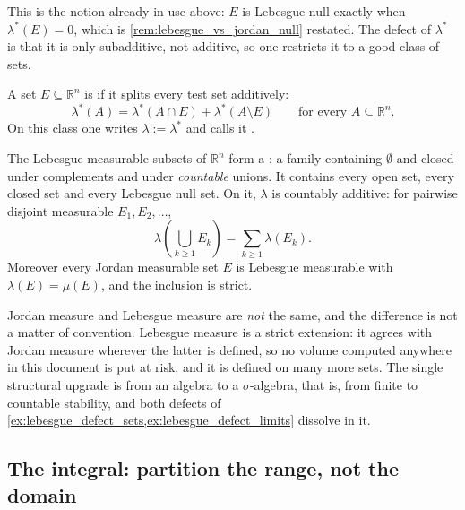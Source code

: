 This is the notion already in use above: $E$ is Lebesgue null exactly when $\lambda^*(E) = 0$, which
is \cref{rem:lebesgue_vs_jordan_null} restated. The defect of $\lambda^*$ is that it is only
subadditive, not additive, so one restricts it to a good class of sets.

\begin{definition}
\label{def:lebesgue_measurable}
A set $E \subseteq \mathbb{R}^n$ is 
 if it splits every test set additively:
\[\lambda^*(A) = \lambda^*(A\cap E) + \lambda^*(A\setminus E) \qquad
\text{for every } A \subseteq \mathbb{R}^n.\]
On this class one writes $\lambda := \lambda^*$ and calls it 
.
\end{definition}

\begin{theorem}
\label{thm:lebesgue_measure_properties}
The Lebesgue measurable subsets of $\mathbb{R}^n$ form a 
: a family containing $\emptyset$ and closed under complements and
under \emph{countable} unions. It contains every open set, every closed set and every Lebesgue null
set. On it, $\lambda$ is countably additive: for pairwise disjoint measurable $E_1,E_2,\dots$,
\[\lambda\left(\bigcup_{k\ge1}E_k\right) = \sum_{k\ge1}\lambda(E_k).\]
Moreover every Jordan measurable set $E$ is Lebesgue measurable with $\lambda(E) = \mu(E)$, and the
inclusion is strict.
\end{theorem}

\begin{remark}
\label{rem:jordan_is_not_lebesgue}
Jordan measure and Lebesgue measure are \emph{not} the same, and the difference is not a matter of
convention. Lebesgue measure is a strict extension: it agrees with Jordan measure wherever the
latter is defined, so no volume computed anywhere in this document is put at risk, and it is
defined on many more sets. The single structural upgrade is from an algebra to a
$\sigma$-algebra, that is, from finite to countable stability, and both defects of
\cref{ex:lebesgue_defect_sets,ex:lebesgue_defect_limits} dissolve in it.
\end{remark}

\subsection{The integral: partition the range, not the domain}

